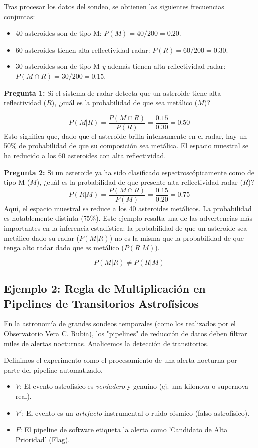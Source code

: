 Tras procesar los datos del sondeo, se obtienen las siguientes frecuencias conjuntas:
\begin{itemize}
    \item 40 asteroides son de tipo M: $P(M) = 40/200 = 0.20$.
    \item 60 asteroides tienen alta reflectividad radar: $P(R) = 60/200 = 0.30$.
    \item 30 asteroides son de tipo M \textit{y} además tienen alta reflectividad radar: $P(M \cap R) = 30/200 = 0.15$.
\end{itemize}

\textbf{Pregunta 1:} Si el sistema de radar detecta que un asteroide tiene alta reflectividad ($R$), ¿cuál es la probabilidad de que sea metálico ($M$)?

$$ P(M|R) = \frac{P(M \cap R)}{P(R)} = \frac{0.15}{0.30} = 0.50 $$
Esto significa que, dado que el asteroide brilla intensamente en el radar, hay un 50\% de probabilidad de que su composición sea metálica. El espacio muestral se ha reducido a los 60 asteroides con alta reflectividad.

\textbf{Pregunta 2:} Si un asteroide ya ha sido clasificado espectroscópicamente como de tipo M ($M$), ¿cuál es la probabilidad de que presente alta reflectividad radar ($R$)?
$$ P(R|M) = \frac{P(M \cap R)}{P(M)} = \frac{0.15}{0.20} = 0.75 $$
Aquí, el espacio muestral se reduce a los 40 asteroides metálicos. La probabilidad es notablemente distinta (75\%). Este ejemplo resalta una de las advertencias más importantes en la inferencia estadística: la probabilidad de que un asteroide sea metálico dado su radar ($P(M|R)$) no es la misma que la probabilidad de que tenga alto radar dado que es metálico ($P(R|M)$).

$$P(M|R)\neq P(R|M)$$

\subsection{Ejemplo 2: Regla de Multiplicación en Pipelines de Transitorios Astrofísicos}

En la astronomía de grandes sondeos temporales (como los realizados por el Observatorio Vera C. Rubin), los "pipelines" de reducción de datos deben filtrar miles de alertas nocturnas. Analicemos la detección de transitorios.

Definimos el experimento como el procesamiento de una alerta nocturna por parte del pipeline automatizado.
\begin{itemize}
    \item $V$: El evento astrofísico es \textit{verdadero} y genuino (ej. una kilonova o supernova real).
    \item $V'$: El evento es un \textit{artefacto} instrumental o ruido cósmico (falso astrofísico).
    \item $F$: El pipeline de software etiqueta la alerta como 'Candidato de Alta Prioridad' (Flag).
\end{itemize}

